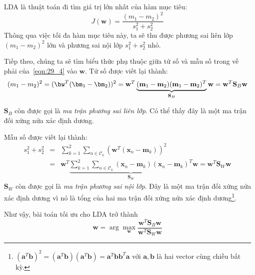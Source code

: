 LDA là thuật toán đi tìm giá trị lớn nhất của hàm mục tiêu:
\begin{equation} 
\label{eqn:29_4}
    J(\mathbf{w}) = \frac{(m_1 - m_2)^2}{s_1^2 + s_2^2}
\end{equation} 
Thông qua việc tối đa hàm mục tiêu này, ta sẽ thu được phương sai liên lớp $(m_1 - m_2)^2$ lớn và phương sai nội lớp $s_1^2 + s_2^2$
nhỏ.

Tiếp theo, chúng ta sẽ tìm biểu thức phụ thuộc giữa tử số và mẫu số trong vế
phải của~\eqref{eqn:29_4} vào $\mathbf{w}$. Tử số được viết lại thành:
\begin{eqnarray*} 
    \label{eqn:29_5}
    (m_1 - m_2)^2 = (\bw^T(\bm_1 - \bm_2))^2 = \mathbf{w}^T
    \underbrace{(\mathbf{m}_1 - \mathbf{m}_2)(\mathbf{m}_1 - \mathbf{m}_2)^T}_{\mathbf{S}_B} \mathbf{w} = \mathbf{w}^T\mathbf{S}_B \mathbf{w}
\end{eqnarray*} 

$\mathbf{S}_B$ còn được gọi là \textit{ma trận phương sai liên lớp}. Có
thể thấy đây là một ma trận đối xứng nửa xác định dương. 

Mẫu số được viết lại thành:
\begin{eqnarray} 
    \nonumber
    s_1^2 + s_2^2 &=& \sum_{k=1}^2 \sum_{n \in \mathcal{C}_k} \left(\mathbf{w}^T(\mathbf{x}_n - \mathbf{m}_k)\right)^2 \\\ 
    \label{eqn:29_6}
    &=&\mathbf{w}^T \underbrace{\sum_{k=1}^2 \sum_{n \in \mathcal{C}_k} (\mathbf{x}_n - \mathbf{m}_k)(\mathbf{x}_n - \mathbf{m}_k)^T}_{\mathbf{S}_W} \mathbf{w} = \mathbf{w}^T\mathbf{S}_W \mathbf{w}
\end{eqnarray} 
$\mathbf{S}_W$ còn được gọi là \textit{ma trận phương sai nội lớp}. Đây
là một ma trận đối xứng nửa xác định dương vì nó là tổng của hai ma trận
đối xứng nửa xác định dương\footnote{\begin{math} 
(\mathbf{a}^T\mathbf{b})^2 = (\mathbf{a}^T\mathbf{b})(\mathbf{a}^T\mathbf{b}) = \mathbf{a}^T\mathbf{b}\mathbf{b}^T\mathbf{a} 
\end{math} 
với $\mathbf{a}, \mathbf{b}$ là hai vector cùng chiều bất kỳ. }.
 
Như vậy, bài toán tối ưu cho LDA trở thành
\begin{equation} 
\label{eqn:29_7}
\mathbf{w}  = \arg\max_{\mathbf{w}}\frac{\mathbf{w}^T\mathbf{S}_B \mathbf{w}}{\mathbf{w}^T\mathbf{S}_W\mathbf{w}}
\end{equation} 
 
